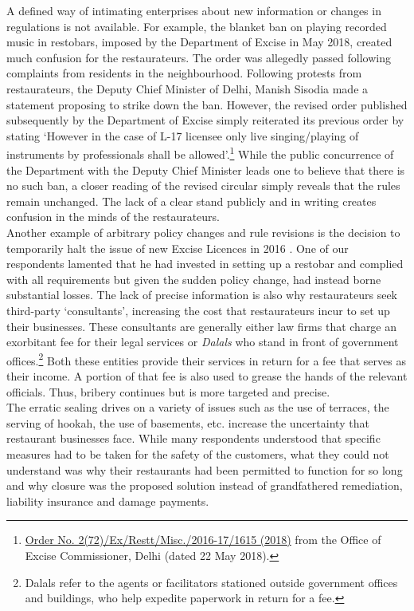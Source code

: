 \documentclass[a4paper, 12pt, twoside]{article}
\begin{document}
		A defined way of intimating enterprises about new information or changes in regulations is not available. For example, the blanket ban on playing recorded music in restobars, imposed by the Department of Excise in May 2018, created much confusion 
for the restaurateurs. The order was allegedly passed following complaints from residents in the neighbourhood. Following protests from restaurateurs, the Deputy Chief Minister of Delhi, Manish Sisodia \parencite{hindu2018recordedmusicnoban} made a statement proposing to strike down 
the ban. However, the revised order published subsequently by the Department of Excise simply reiterated its previous order by stating ‘However in the case of L-17 licensee only live singing/playing of instruments by professionals shall be allowed’.\footnote{\href{https://bit.ly/2QxMK56}{Order No. 2(72)/Ex/Restt/Misc./2016-17/1615 (2018)} from the Office of Excise Commissioner, Delhi (dated 22 May 2018).}  While the public concurrence of the Department with the Deputy Chief Minister leads one to believe 
that there is no such ban, a closer reading of the revised circular simply reveals that the rules remain unchanged. The lack of a clear stand publicly and in writing creates confusion in the minds of the restaurateurs. \\
		
		Another example of arbitrary policy changes and rule revisions is the decision to temporarily halt the issue of new Excise Licences in 2016 \parencite{toi2016nonewliqlicense}. One of our respondents lamented that he had invested in setting up a restobar and complied with 
all requirements but given the sudden policy change, had instead borne substantial losses. The lack of precise information is also why restaurateurs seek third-party ‘consultants’, increasing the cost that restaurateurs incur to set up their businesses. These 
consultants are generally either law firms that charge an exorbitant fee for their legal services or \textit{Dalals} who stand in front of government offices.\footnote{Dalals refer to the agents or facilitators stationed outside government offices and buildings, who help 
expedite paperwork in return for a fee.} Both these entities provide their services in return for a fee that serves as their income. A portion of that fee is also used to grease the hands of the relevant officials. Thus, bribery continues but is more targeted and precise.\\
		
		The erratic sealing drives on a variety of issues such as the use of terraces, the serving of hookah, the use of basements, etc. increase the uncertainty that restaurant businesses face. While many respondents understood that specific measures had to 
be taken for the safety of the customers, what they could not understand was why their restaurants had been permitted to function for so long and why closure was the proposed solution instead of grandfathered remediation, liability insurance and damage 
payments.
\end{document}
